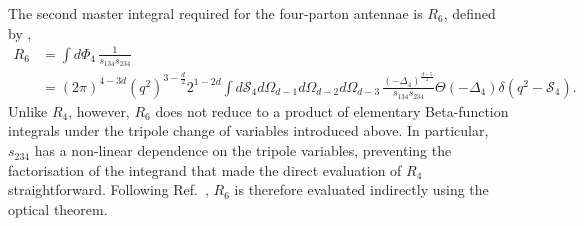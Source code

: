 The second master integral required for the four-parton antennae is $R_6$, defined by
\cite{GehrmannDeRidder0311276},
\begin{equation}
    \begin{split}
        R_6 &= \int d\Phi_4\,\frac1{s_{134}s_{234}}\\
            &= (2\pi)^{4-3d}\!\left(q^2\right)^{3-\frac d2}2^{1-2d}\int d\mathcal S_4d\Omega_{d-1}d\Omega_{d-2}d\Omega_{d-3}\,\frac{(-\Delta_4)^{\frac{d-5}{2}}}{s_{134}s_{234}}\Theta(-\Delta_4)\delta\!\left(q^2-\mathcal S_4\right).
    \end{split}
\end{equation}
Unlike $R_4$, however, $R_6$ does not reduce to a product of elementary Beta-function integrals
under the tripole change of variables introduced above. In particular, $s_{234}$ has a
non-linear dependence on the tripole variables, preventing the factorisation of the integrand
that made the direct evaluation of $R_4$ straightforward. Following
Ref.~\cite{GehrmannDeRidder0311276}, $R_6$ is therefore evaluated indirectly using the optical
theorem.

